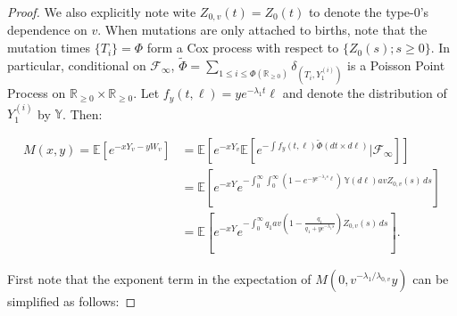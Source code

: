 \documentclass{article}
\numberwithin{equation}{section}
\begin{document}
\begin{proof}
  We also explicitly note wite $Z_{0,v}(t)=Z_0(t)$ to denote the type-0's dependence on $v$. When mutations are only attached to births, note that the mutation times $\{T_i\}=\Phi$ form a Cox process with respect to $\{Z_0(s);s\geq 0\}$. In particular, conditional on $\mathcal{F}_\infty$, $\widetilde{\Phi}=\sum_{1\leq i\leq \Phi(\mathbb{R}_{\geq 0})}\delta_{(T_i,Y_1^{(i)})}$ is a Poisson Point Process on $\mathbb{R}_{\geq 0}\times \mathbb{R}_{\geq 0}$. Let $f_y(t,\ell)=ye^{-\lambda_1 t}\ell$ and denote the distribution of $Y_1^{(i)}$ by $\mathbb{Y}$. Then:

\begin{align*}
  M(x,y)=\mathbb{E}\left[e^{-xY_v-yW_v}\right]&=\mathbb{E}[e^{-xY_v}\mathbb{E}[e^{-\int f_y(t,\ell)\widetilde{\Phi}(dt\times d\ell)}|\mathcal{F}_{\infty}]]\\
  &=\mathbb{E}[e^{-xY}e^{-\int_0^\infty \int_0^\infty (1-e^{-ye^{-\lambda_1 s}\ell})\,\mathbb{Y}(d\ell)avZ_{0,v}(s)\,ds}]\\
  &=\mathbb{E}[e^{-xY}e^{-\int_0^\infty q_1av (1-\frac{q_1}{q_1+ye^{-\lambda_1 s}})Z_{0,v}(s)\,ds}].
\end{align*}

First note that the exponent term in the expectation of $M(0,v^{-\lambda_1/\lambda_{0,v}}y)$ can be simplified as follows:


\end{proof}
\end{document}
